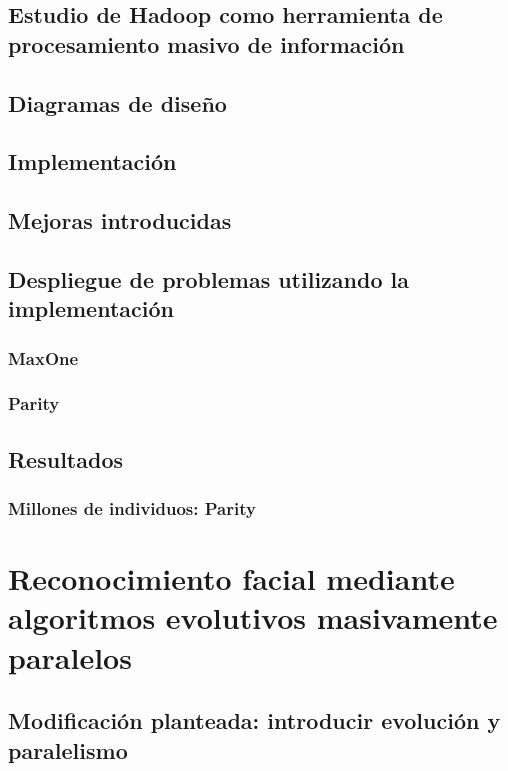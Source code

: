 \documentclass{estilos-y-libreria}
\begin{document}
	\section{Estudio de Hadoop como herramienta de procesamiento masivo de informaci\'on	\label{desarrollo-hadoop}}
		
	\section{Diagramas de dise\~no}
		
	\section{Implementaci\'on}
		
	\section{Mejoras introducidas}
		
	\section{Despliegue de problemas utilizando la implementaci\'on}
		
		\subsection{MaxOne}
			
		\subsection{Parity}
			
	\section{Resultados}
			
		\subsection{Millones de individuos: Parity}
				
			
\chapter{Reconocimiento facial mediante algoritmos evolutivos masivamente paralelos}\label{facerecognition}
	
	\section{Modificación planteada: introducir evolución y paralelismo}
		
\end{document}
